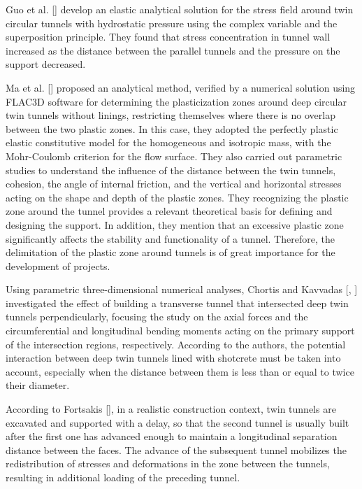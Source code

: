 \documentclass[a4paper,fleqn]{cas-sc}
\begin{document}
Guo et al. [] develop an elastic analytical solution for the stress field around twin circular tunnels with hydrostatic pressure using the complex variable and the superposition principle. They found that stress concentration in tunnel wall increased as the distance between the parallel tunnels and the pressure on the support decreased.

Ma et al. [] proposed an analytical method, verified by a numerical solution using FLAC3D software for determining the plasticization zones around deep circular twin tunnels without linings, restricting themselves where there is no overlap between the two plastic zones. In this case, they adopted the perfectly plastic elastic constitutive model for the homogeneous and isotropic mass, with the Mohr-Coulomb criterion for the flow surface. They also carried out parametric studies to understand the influence of the distance between the twin tunnels, cohesion, the angle of internal friction, and the vertical and horizontal stresses acting on the shape and depth of the plastic zones. They recognizing the plastic zone around the tunnel provides a relevant theoretical basis for defining and designing the support. In addition, they mention that an excessive plastic zone significantly affects the stability and functionality of a tunnel. Therefore, the delimitation of the plastic zone around tunnels is of great importance for the development of projects.

Using parametric three-dimensional numerical analyses, Chortis and Kavvadas [, ] investigated the effect of building a transverse tunnel that intersected deep twin tunnels perpendicularly, focusing the study on the axial forces and the circumferential and longitudinal bending moments acting on the primary support of the intersection regions, respectively. According to the authors, the potential interaction between deep twin tunnels lined with shotcrete must be taken into account, especially when the distance between them is less than or equal to twice their diameter.

According to Fortsakis [], in a realistic construction context, twin tunnels are excavated and supported with a delay, so that the second tunnel is usually built after the first one has advanced enough to maintain a longitudinal separation distance between the faces. The advance of the subsequent tunnel mobilizes the redistribution of stresses and deformations in the zone between the tunnels, resulting in additional loading of the preceding tunnel.
\end{document}
